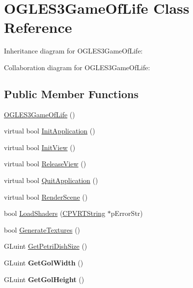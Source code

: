 \hypertarget{class_o_g_l_e_s3_game_of_life}{\section{O\+G\+L\+E\+S3\+Game\+Of\+Life Class Reference}
\label{class_o_g_l_e_s3_game_of_life}
}


Inheritance diagram for O\+G\+L\+E\+S3\+Game\+Of\+Life\+:


Collaboration diagram for O\+G\+L\+E\+S3\+Game\+Of\+Life\+:
\subsection*{Public Member Functions}
\begin{DoxyCompactItemize}
\item 
\hyperlink{class_o_g_l_e_s3_game_of_life_a12aa0da9ac219942362a1b9b7e0614cf}{O\+G\+L\+E\+S3\+Game\+Of\+Life} ()
\item 
virtual bool \hyperlink{class_o_g_l_e_s3_game_of_life_a0107dab60f3e269f743fd4bfc691f9d7}{Init\+Application} ()
\item 
virtual bool \hyperlink{class_o_g_l_e_s3_game_of_life_af01984b4e5060e14006b73038786b4bc}{Init\+View} ()
\item 
virtual bool \hyperlink{class_o_g_l_e_s3_game_of_life_a4cbc03ea0d7f06517c48e2e7a3dbcba4}{Release\+View} ()
\item 
virtual bool \hyperlink{class_o_g_l_e_s3_game_of_life_ad106a10ecb87189fb74031be84d42fcd}{Quit\+Application} ()
\item 
virtual bool \hyperlink{class_o_g_l_e_s3_game_of_life_ab85eed0bf61f4f697382b5d9175ded6c}{Render\+Scene} ()
\item 
bool \hyperlink{class_o_g_l_e_s3_game_of_life_af43ba0f055bd6622a969c496a91301d4}{Load\+Shaders} (\hyperlink{class_c_p_v_r_t_string}{C\+P\+V\+R\+T\+String} $\ast$p\+Error\+Str)
\item 
bool \hyperlink{class_o_g_l_e_s3_game_of_life_a87a3b18dea2b9efac67476f1e28e028d}{Generate\+Textures} ()
\item 
G\+Luint \hyperlink{class_o_g_l_e_s3_game_of_life_aafb47c945a888c6698af30dc8eef02b4}{Get\+Petri\+Dish\+Size} ()
\item 
\hypertarget{class_o_g_l_e_s3_game_of_life_a26046a3e6cf4a0c2aa0e1baf65919817}{G\+Luint {\bfseries Get\+Gol\+Width} ()}\label{class_o_g_l_e_s3_game_of_life_a26046a3e6cf4a0c2aa0e1baf65919817}

\item 
\hypertarget{class_o_g_l_e_s3_game_of_life_aa5d73145fda1bf1c1a10520eb8e5e247}{G\+Luint {\bfseries Get\+Gol\+Height} ()}\label{class_o_g_l_e_s3_game_of_life_aa5d73145fda1bf1c1a10520eb8e5e247}


\end{DoxyCompactItemize}
